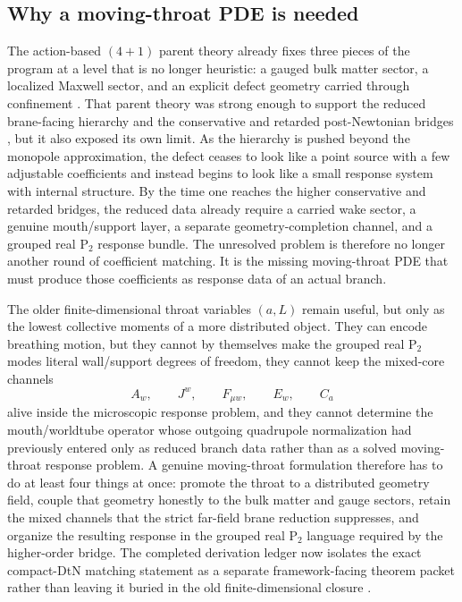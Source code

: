 \documentclass[11pt]{article}
\theoremstyle{definition}
\newcommand{\Ptwo}{\ensuremath{\mathrm{P}_2}}
\begin{document}
\subsection{Why a moving-throat PDE is needed}

The action-based $(4+1)$ parent theory already fixes three pieces of the program at a level that is no longer heuristic: a gauged bulk matter sector, a localized Maxwell sector, and an explicit defect geometry carried through confinement \cite{Norris2026Parent4D,Norris2026Maxwell4D}. That parent theory was strong enough to support the reduced brane-facing hierarchy and the conservative and retarded post-Newtonian bridges \cite{Norris2026TwoPN,Norris2026TwoPointFivePN,Norris2026ThreePN,Norris2026FourPN}, but it also exposed its own limit. As the hierarchy is pushed beyond the monopole approximation, the defect ceases to look like a point source with a few adjustable coefficients and instead begins to look like a small response system with internal structure. By the time one reaches the higher conservative and retarded bridges, the reduced data already require a carried wake sector, a genuine mouth/support layer, a separate geometry-completion channel, and a grouped real $\Ptwo$ response bundle. The unresolved problem is therefore no longer another round of coefficient matching. It is the missing moving-throat PDE that must produce those coefficients as response data of an actual branch.

The older finite-dimensional throat variables $(a,L)$ remain useful, but only as the lowest collective moments of a more distributed object. They can encode breathing motion, but they cannot by themselves make the grouped real $\Ptwo$ modes literal wall/support degrees of freedom, they cannot keep the mixed-core channels
\[
A_w,\qquad J^w,\qquad F_{\mu w},\qquad E_w,\qquad C_a
\]
alive inside the microscopic response problem, and they cannot determine the mouth/worldtube operator whose outgoing quadrupole normalization had previously entered only as reduced branch data rather than as a solved moving-throat response problem. A genuine moving-throat formulation therefore has to do at least four things at once: promote the throat to a distributed geometry field, couple that geometry honestly to the bulk matter and gauge sectors, retain the mixed channels that the strict far-field brane reduction suppresses, and organize the resulting response in the grouped real $\Ptwo$ language required by the higher-order bridge. The completed derivation ledger now isolates the exact compact-DtN matching statement as a separate framework-facing theorem packet rather than leaving it buried in the old finite-dimensional closure \cite{Norris2026PDELedger}.
\end{document}
